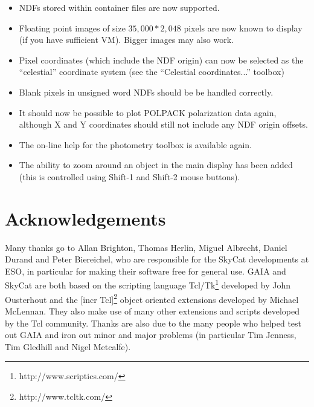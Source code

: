 \documentclass[twoside,11pt]{article}
\newcommand{\htmladdnormallinkfoot}[2]{#1\footnote{#2}}
\newcommand{\htmladdnormallink}[2]{#1}
\newcommand{\xlabel}[1]{}
\renewcommand{\_}{\texttt{\symbol{95}}}
\begin{document}
\begin{itemize}
\item NDFs stored within container files are now supported.

\item Floating point images of size $35,000*2,048$ pixels are now known to
      display (if you have sufficient VM). Bigger images may also work.

\item Pixel coordinates (which include the NDF origin) can now be
      selected as the ``celestial'' coordinate system (see the
      ``Celestial coordinates...'' toolbox)

\item Blank pixels in unsigned word NDFs should be be handled
      correctly.

\item It should now be possible to plot POLPACK polarization data
      again, although X and Y coordinates should still not include any 
      NDF origin offsets.

\item The on-line help for the photometry toolbox is available
      again.

\item The ability to zoom around an object in the main display has
      been added (this is controlled using Shift-1 and Shift-2 mouse
      buttons).

\end{itemize}


\section{\xlabel{acknowledgements}Acknowledgements}

Many thanks go to Allan Brighton, Thomas Herlin, Miguel Albrecht,
Daniel Durand and Peter Biereichel, who are responsible for the
\htmladdnormallink{SkyCat}{http://archive.eso.org/skycat/}
developments at ESO, in particular for making their software free for
general use. 
GAIA and SkyCat are both based on the scripting language
\htmladdnormallinkfoot{Tcl/Tk}{http://www.scriptics.com/} developed by
John Ousterhout and the \htmladdnormallinkfoot{[incr Tcl]}
{http://www.tcltk.com/} object oriented extensions developed by
Michael McLennan.  
They also make use of many other extensions and scripts developed by
the Tcl community. 
Thanks are also due to the many people who helped test out GAIA and
iron out minor and major problems (in particular Tim Jenness, Tim
Gledhill and Nigel Metcalfe). 

\end{document}
